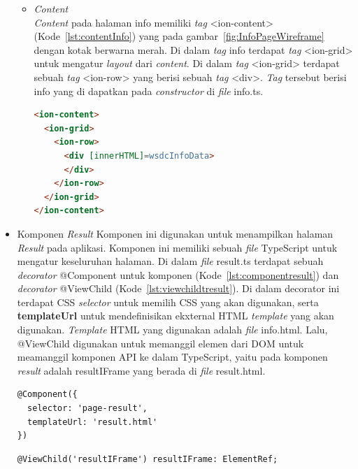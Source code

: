 \begin{itemize}
\begin{itemize}
		\item \textit{Content} \\
		\textit{Content} pada halaman info memiliki \textit{tag} <ion-content> (Kode~\ref{lst:contentInfo}) yang pada gambar~\ref{fig:InfoPageWireframe} dengan kotak berwarna merah. Di dalam \textit{tag} info terdapat \textit{tag} <ion-grid> untuk mengatur \textit{layout} dari \textit{content}. Di dalam \textit{tag} <ion-grid> terdapat sebuah \textit{tag} <ion-row> yang berisi sebuah \textit{tag} <div>. \textit{Tag} tersebut berisi info yang di dapatkan pada \textit{constructor} di \textit{file} info.ts.

\begin{lstlisting}[language=html, label={lst:contentInfo}, caption=\textit{Content} pada info.html]
<ion-content>
  <ion-grid>
    <ion-row>
      <div [innerHTML]=wsdcInfoData>
      </div>
    </ion-row>
  </ion-grid>
</ion-content>
\end{lstlisting} 
	\end{itemize}

	\item Komponen \textit{Result}
	Komponen ini digunakan untuk menampilkan halaman \textit{Result} pada aplikasi. Komponen ini memiliki sebuah \textit{file} TypeScript untuk mengatur keseluruhan halaman. Di dalam \textit{file} result.ts terdapat sebuah \textit{decorator} @Component untuk komponen (Kode~\ref{lst:componentresult}) dan \textit{decorator} @ViewChild (Kode~\ref{lst:viewchildtresult}). Di dalam decorator ini terdapat CSS \textit{selector} untuk memilih CSS yang akan digunakan, serta \textbf{templateUrl} untuk mendefinisikan ekxternal HTML \textit{template} yang akan digunakan. \textit{Template} HTML yang digunakan adalah \textit{file} info.html. Lalu, @ViewChild digunakan untuk memanggil elemen dari DOM untuk meamanggil komponen API ke dalam TypeScript, yaitu pada komponen \textit{result} adalah resultIFrame yang berada di \textit{file} result.html.
	
\begin{lstlisting}[language=html, label={lst:componentresult}, caption=@Component pada result.ts]
@Component({
  selector: 'page-result',
  templateUrl: 'result.html'
})
\end{lstlisting} 

\begin{lstlisting}[language=html, label={lst:viewchildtresult}, caption=@ViewChild pada result.ts]
@ViewChild('resultIFrame') resultIFrame: ElementRef;
\end{lstlisting} 


\end{itemize}
